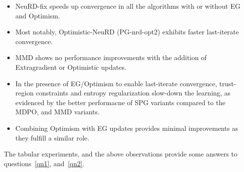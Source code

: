 \begin{itemize}
	\item {NeuRD-fix speeds up convergence in all the algorithms with or without EG and Optimism.
	      }
	\item {Most notably, Optimistic-NeuRD (PG-nrd-opt2) exhibits faster last-iterate convergence.
	      }
	\item {MMD shows no performance improvements with the addition of Extragradient or Optimistic updates.
	      }
	\item {In the presence of EG/Optimism to enable last-iterate convergence, trust-region constraints and entropy
	      regularization slow-down the learning, as evidenced by the better performacne of SPG variants compared to the MDPO, and MMD variants.}
	\item {Combining Optimism with EG updates provides minimal improvements as they fulfill a similar role.
	      }
\end{itemize}

The tabular experiments, and the above observations provide some answers to questions~\ref{qn1},
and~\ref{qn2}.
